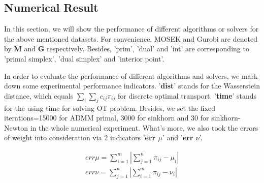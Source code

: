 \documentclass{article}
\begin{document}
\begin{large}
\subsection{Numerical Result}
In this section, we will show the performance of different algorithms or solvers for the above mentioned datasets. For convenience, MOSEK and Gurobi are denoted by \textbf{M} and \textbf{G} respectively. Besides, 'prim', 'dual' and 'int' are corresponding to 'primal simplex', 'dual simplex' and 'interior point'.

In order to evaluate the performance of different algorithms and solvers, we mark down some experimental performance indicators. '\textbf{dist}' stands for the Wasserstein distance, which equals $\sum_{i}\sum_{j}c_{ij}\pi_{ij}$ for discrete optimal transport. '\textbf{time}' stands for the using time for solving OT problem. Besides, we set the fixed iterations=15000 for ADMM primal, 3000 for sinkhorn and 30 for sinkhorn-Newton in the whole numerical experiment. What's more, we also took the errors of weight into consideration via 2 indicators '\textbf{err $\mu$}' and '\textbf{err $\nu$}'.

\begin{equation}
  \begin{aligned}
  err \mu=\sum_{i=1}^{m}\left|\sum_{j=1}^{n}\pi_{ i j } - \mu_i \right|\\
  err \nu=\sum_{j=1}^{n}\left|\sum_{i=1}^{m}\pi_{ i j } - \nu_i \right|
  \end{aligned}
\end{equation}


\end{large}
\end{document}

